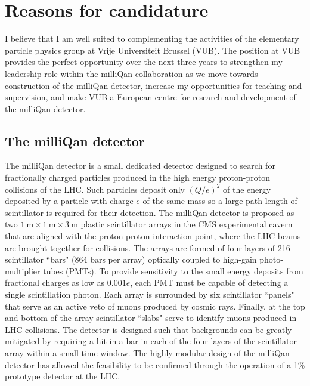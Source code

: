\documentclass[11pt]{article}
\theoremstyle{plain} \numberwithin{equation}{section}
\theoremstyle{definition}
\begin{document}
\section*{Reasons for candidature}
\noindent 

I believe that I am well suited to complementing the activities of the 
elementary particle physics group at Vrije Universiteit Brussel (VUB). 
The position at VUB provides the perfect opportunity over the next three years 
to strengthen my leadership role within the milliQan collaboration as we move 
towards construction of the milliQan detector, increase my opportunities for 
teaching and supervision, and make VUB a European centre
for research and development of the milliQan detector.

\subsection*{The milliQan detector}

The milliQan detector is a small dedicated detector 
designed to search for fractionally 
charged particles produced in the high energy proton-proton collisions of the LHC. 
Such particles deposit only $(Q/e)^2$ of the energy 
deposited by a particle with charge $e$ of
the same mass so a large path length of scintillator is required for
their detection. The milliQan detector is proposed as two 
$1~\mathrm{m}\times1~\mathrm{m}\times3~\mathrm{m}$ plastic scintillator arrays 
in the CMS experimental cavern that are aligned with the proton-proton 
interaction point, where the LHC beams are brought together for collisions. 
The arrays are formed of four layers of 216 scintillator ``bars" 
(864 bars per array) optically coupled to high-gain photo-multiplier tubes (PMTs). To provide 
sensitivity to the small energy deposits from fractional charges as low as $0.001 e$, 
each PMT must be capable of detecting a single scintillation photon. Each array is surrounded by six 
scintillator ``panels" that serve as an active veto of muons produced 
by cosmic rays. Finally, at the top and bottom of the array
scintillator ``slabs" serve to identify muons produced in LHC collisions. 
The detector is designed such that backgrounds can be greatly mitigated
by requiring a hit in a bar in each of the four layers 
of the scintillator array within a small time 
window. The highly modular design of the milliQan detector 
has allowed the feasibility to be confirmed through the operation 
of a 1\% prototype detector at the LHC.
\end{document}
